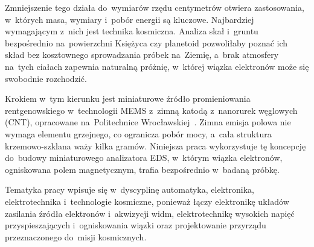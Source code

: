 Zmniejszenie tego działa do~wymiarów rzędu centymetrów otwiera
zastosowania, w~których masa, wymiary i~pobór energii są kluczowe.
Najbardziej wymagającym z~nich jest technika kosmiczna. Analiza skał
i~gruntu bezpośrednio na~powierzchni Księżyca czy planetoid pozwoliłaby
poznać ich skład bez kosztownego sprowadzania próbek na~Ziemię,
a~brak atmosfery na~tych ciałach zapewnia naturalną próżnię,
w~której wiązka elektronów może się swobodnie rozchodzić.

Krokiem w~tym kierunku jest miniaturowe źródło promieniowania
rentgenowskiego w~technologii MEMS z~zimną katodą z~nanorurek węglowych
(CNT), opracowane na~Politechnice Wrocławskiej~\cite{TODO-urbanski}.
Zimna emisja polowa nie wymaga elementu grzejnego, co ogranicza pobór
mocy, a~cała struktura krzemowo-szklana waży kilka gramów. Niniejsza
praca wykorzystuje tę koncepcję do~budowy miniaturowego analizatora EDS,
w~którym wiązka elektronów, ogniskowana polem magnetycznym, trafia
bezpośrednio w~badaną próbkę.

Tematyka pracy wpisuje się w~dyscyplinę automatyka, elektronika,
elektrotechnika i~technologie kosmiczne, ponieważ łączy elektronikę
układów zasilania źródła elektronów i~akwizycji widm, elektrotechnikę
wysokich napięć przyspieszających i~ogniskowania wiązki oraz
projektowanie przyrządu przeznaczonego do~misji kosmicznych.
